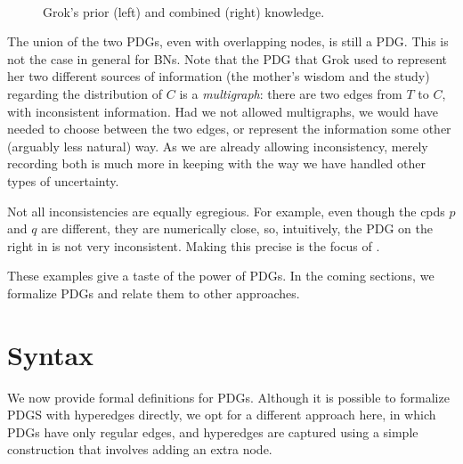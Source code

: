 \documentclass[letterpaper]{article} %
\newcommand\cmergearr[4]{
		\draw[arr,-] (#1) -- (#4) -- (#2);
		\draw[arr, shorten <=0] (#4) -- (#3);
	}
\newcommand\mergearr[3]{
		\coordinate (center-#1#2#3) at (barycentric cs:#1=1,#2=1,#3=1.2);
		\cmergearr{#1}{#2}{#3}{center-#1#2#3}
	}
\theoremstyle{plain}
\theoremstyle{definition}
\theoremstyle{remark}
\begin{document}
\begin{example}
\begin{figure}
	\fi
	\hfill~
	\caption{Grok's prior (left) and combined (right) knowledge.}
	\label{fig:grok-combine}
\end{figure}

The union of the two PDGs, even with overlapping 
nodes, is still a PDG.
This is not the case in general
for BNs.
Note that the PDG that Grok used to
represent her two different sources of information (the mother's wisdom and the
study) regarding the distribution of $C$ is a \emph{multigraph}: there are two
edges from $T$ to $C$, with inconsistent information.
Had we not allowed multigraphs, we would have needed to choose between the two edges, or represent the
information some other (arguably less natural) way. As we are already allowing
inconsistency, merely recording both is much more in keeping with the way we
have handled other types of uncertainty. 
\end{example}

Not all inconsistencies are equally egregious. For example, even though the cpds
$p$ and $q$ are different, they are numerically close, so, intuitively, the PDG on the right in
 is not very inconsistent.
Making this precise 
is
the focus of .


        
These examples give a taste of the power of PDGs.  In the coming sections, we formalize PDGs and relate them to other approaches.		
	
	
\section{Syntax}\label{sec:formal+syntax}
We now provide formal definitions for PDGs.        
Although it is possible to formalize PDGS with hyperedges directly,
    we opt for a different approach here, in which PDGs have only regular edges,
and hyperedges are captured using a simple construction
that involves adding an extra node.
\end{document}
